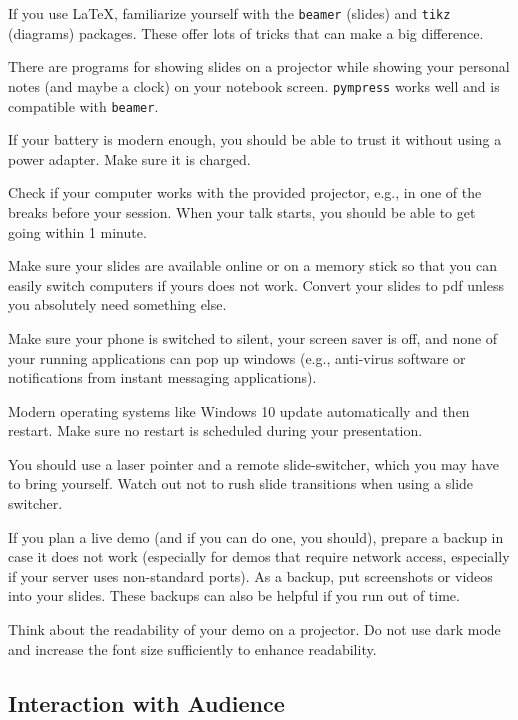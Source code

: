 \documentclass[12pt]{article}
\begin{document}
If you use LaTeX, familiarize yourself with the \texttt{beamer} (slides) and \texttt{tikz} (diagrams) packages.
These offer lots of tricks that can make a big difference.
\medskip

There are programs for showing slides on a projector while showing your personal notes (and maybe a clock) on your notebook screen.
\texttt{pympress} works well and is compatible with \texttt{beamer}. 
\medskip

If your battery is modern enough, you should be able to trust it without using a power adapter.
Make sure it is charged.
\medskip

Check if your computer works with the provided projector, e.g., in one of the breaks before your session.
When your talk starts, you should be able to get going within 1 minute.
\medskip

Make sure your slides are available online or on a memory stick so that you can easily switch computers if yours does not work.
Convert your slides to pdf unless you absolutely need something else.
\medskip

Make sure your phone is switched to silent, your screen saver is off, and none of your running applications can pop up windows (e.g., anti-virus software or notifications from instant messaging applications).
\medskip

Modern operating systems like Windows 10 update automatically and then restart.
Make sure no restart is scheduled during your presentation.
\medskip

You should use a laser pointer and a remote slide-switcher, which you may have to bring yourself.
Watch out not to rush slide transitions when using a slide switcher.
\medskip

If you plan a live demo (and if you can do one, you should), prepare a backup in case it does not work (especially for demos that require network access, especially if your server uses non-standard ports).
As a backup, put screenshots or videos into your slides.
These backups can also be helpful if you run out of time.
\medskip

Think about the readability of your demo on a projector.
Do not use dark mode and increase the font size sufficiently to enhance readability.

\subsection{Interaction with Audience}
\end{document}
